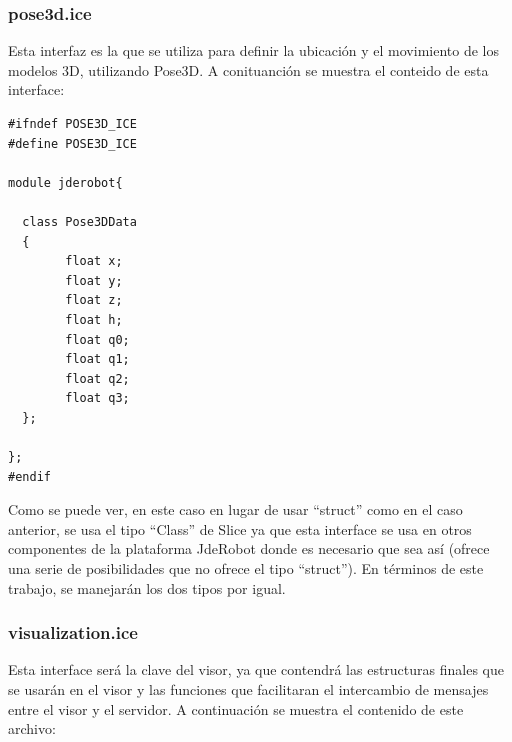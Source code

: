 \subsubsection{pose3d.ice}
Esta interfaz es la que se utiliza para definir la ubicación y el movimiento de los modelos 3D, utilizando Pose3D. A conituanción se muestra el conteido de esta interface:


\begin{lstlisting}[frame=single]
#ifndef POSE3D_ICE
#define POSE3D_ICE

module jderobot{

  class Pose3DData
  {
		float x;
		float y;
		float z;
  		float h;
		float q0;
		float q1;
		float q2;
		float q3;
  };

}; 
#endif
\end{lstlisting}
Como se puede ver, en este caso en lugar de usar ``struct'' como en el caso anterior, se usa el tipo ``Class'' de Slice  ya que esta interface se usa en otros componentes de la plataforma JdeRobot donde es necesario que sea así (ofrece una serie de posibilidades que no ofrece el tipo ``struct''). En términos de este trabajo, se manejarán los dos tipos por igual.

\subsubsection{visualization.ice}
Esta interface será la clave del visor, ya que contendrá las estructuras finales que se usarán en el visor y las funciones que facilitaran el intercambio de mensajes entre el visor y el servidor. A continuación se muestra el contenido de este archivo:

